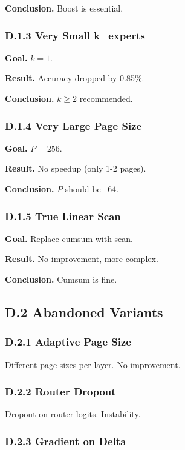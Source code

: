 \textbf{Conclusion.} Boost is essential.

\subsubsection{D.1.3 Very Small k\_experts}

\textbf{Goal.} $k = 1$.

\textbf{Result.} Accuracy dropped by 0.85\%.

\textbf{Conclusion.} $k \geq 2$ recommended.

\subsubsection{D.1.4 Very Large Page Size}

\textbf{Goal.} $P = 256$.

\textbf{Result.} No speedup (only 1-2 pages).

\textbf{Conclusion.} $P$ should be ~64.

\subsubsection{D.1.5 True Linear Scan}

\textbf{Goal.} Replace cumsum with scan.

\textbf{Result.} No improvement, more complex.

\textbf{Conclusion.} Cumsum is fine.

\subsection{D.2 Abandoned Variants}

\subsubsection{D.2.1 Adaptive Page Size}

Different page sizes per layer. No improvement.

\subsubsection{D.2.2 Router Dropout}

Dropout on router logits. Instability.

\subsubsection{D.2.3 Gradient on Delta}

